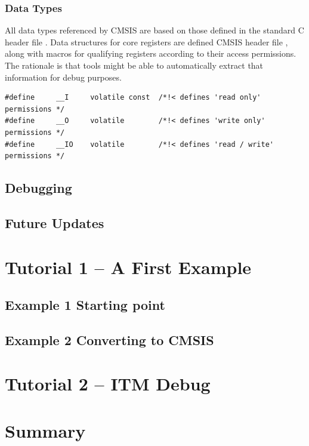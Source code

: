 \subsubsection{Data Types}

All data types referenced by CMSIS are based on those defined in the standard C
header file . Data structures for core registers are defined
CMSIS header file , along with macros for qualifying registers
according to their access permissions. The rationale is that tools might be able
to automatically extract that information for debug purposes.

\begin{lstlisting}[style=cpp]
#define 	__I 	volatile const	/*!< defines 'read only' permissions */
#define		__O 	volatile 		/*!< defines 'write only' permissions */
#define 	__IO 	volatile 		/*!< defines 'read / write' permissions */
\end{lstlisting}

\subsection{Debugging}
\subsection{Future Updates}
\section{Tutorial 1 – A First Example}
\subsection{Example 1 Starting point}
\subsection{Example 2 Converting to CMSIS}
\section{Tutorial 2 – ITM Debug}
\section{Summary}



